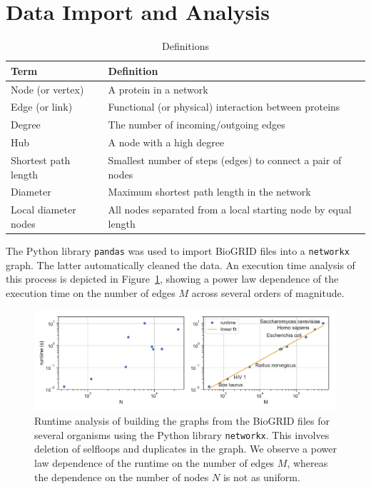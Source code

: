 \documentclass[9pt,onecolumn,twoside]{pnas-new}
\begin{document}
\section*{Data Import and Analysis}
\begin{table}
\centering
\caption{\textmd{Definitions}} \label{tab:symbols} 
\begin{tabular}{l p{}}
\hline
Term              & Definition \\
\hline
Node (or vertex)    & A protein in a network \\
Edge (or link)    & Functional (or physical) interaction between proteins \\
Degree    & The number of incoming/outgoing edges \\
Hub  & A node with a high degree\\
Shortest path length  & Smallest number of steps (edges) to connect a pair of nodes\\
Diameter & Maximum shortest path length in the network\\
Local diameter nodes & All nodes separated from a local starting node by equal length  \\
\hline
\end{tabular}
\end{table}

The Python library \texttt{pandas} was used to import BioGRID files into a \texttt{networkx} graph. The latter automatically cleaned the data. An execution time analysis of this process is depicted in Figure~\ref{fig:runtime_buildgraph}, showing a power law dependence of the execution time on the number of edges $M$ across several orders of magnitude.

\begin{figure}
    \centering
    \includegraphics[width=0.9\columnwidth]{images/runtimes_loadgraph_annotated.pdf}
    \caption{Runtime analysis of building the graphs from the BioGRID files for several organisms using the Python library \texttt{networkx}. This involves deletion of selfloops and duplicates in the graph. We observe a power law dependence of the runtime on the number of edges $M$, whereas the dependence on the number of nodes $N$ is not as uniform.}
    \label{fig:runtime_buildgraph}
\end{figure}
\end{document}
